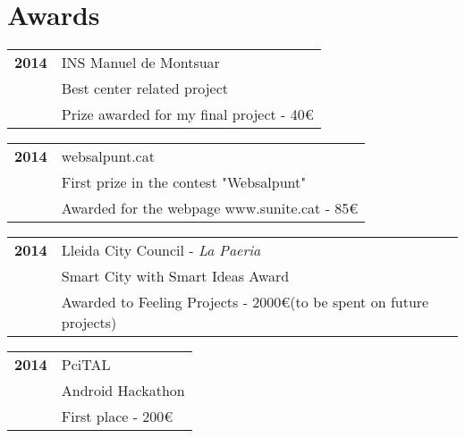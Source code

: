 \section{Awards}
\begin{center}
\begin{tabular}{>{\bfseries \hfill} p{2cm} p{12cm}}
	2014		& INS Manuel de Montsuar	\\
	~		& Best center related project	\\
	~		& Prize awarded for my final project - 40\euro \\ 
\end{tabular}
\vspace{5mm}
\begin{tabular}{>{\bfseries \hfill} p{2cm} p{12cm}}
	2014		& websalpunt.cat \\
	~		& First prize in the contest "Websalpunt" \\
	~		& Awarded for the webpage www.sunite.cat - 85\euro \\ 
\end{tabular}
\vspace{5mm}
\begin{tabular}{>{\bfseries \hfill} p{2cm} p{12cm}}
	2014		& Lleida City Council - \textit{La Paeria} \\
	~		& Smart City with Smart Ideas Award \\
	~		& Awarded to Feeling Projects - 2000\euro (to be spent on future projects)\\
\end{tabular}
\vspace{5mm}
\begin{tabular}{>{\bfseries \hfill} p{2cm} p{12cm}}
	2014		& PciTAL				\\
	~		& Android Hackathon		 	\\
	~		& First place - 200\euro		\\
\end{tabular}
\end{center}
